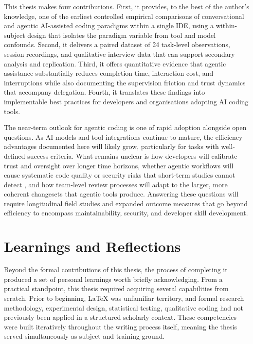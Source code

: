 This thesis makes four contributions. First, it provides, to the best of the author's knowledge, one of the earliest controlled empirical comparisons of conversational and agentic AI-assisted coding paradigms within a single IDE, using a within-subject design that isolates the paradigm variable from tool and model confounds. Second, it delivers a paired dataset of 24 task-level observations, session recordings, and qualitative interview data that can support secondary analysis and replication. Third, it offers quantitative evidence that agentic assistance substantially reduces completion time, interaction cost, and interruptions while also documenting the supervision friction and trust dynamics that accompany delegation. Fourth, it translates these findings into implementable best practices for developers and organisations adopting AI coding tools.

The near-term outlook for agentic coding is one of rapid adoption alongside open questions. As AI models and tool integrations continue to mature, the efficiency advantages documented here will likely grow, particularly for tasks with well-defined success criteria. What remains unclear is how developers will calibrate trust and oversight over longer time horizons, whether agentic workflows will cause systematic code quality or security risks that short-term studies cannot detect \parencite{perry2023insecure, qodo2025codequality}, and how team-level review processes will adapt to the larger, more coherent changesets that agentic tools produce. Answering these questions will require longitudinal field studies and expanded outcome measures that go beyond efficiency to encompass maintainability, security, and developer skill development.


\section{Learnings and Reflections}

Beyond the formal contributions of this thesis, the process of completing it produced a set of personal learnings worth briefly acknowledging. From a practical standpoint, this thesis required acquiring several capabilities from scratch. Prior to beginning, \LaTeX{} was unfamiliar territory, and formal research methodology, experimental design, statistical testing, qualitative coding had not previously been applied in a structured scholarly context. These competencies were built iteratively throughout the writing process itself, meaning the thesis served simultaneously as subject and training ground.

